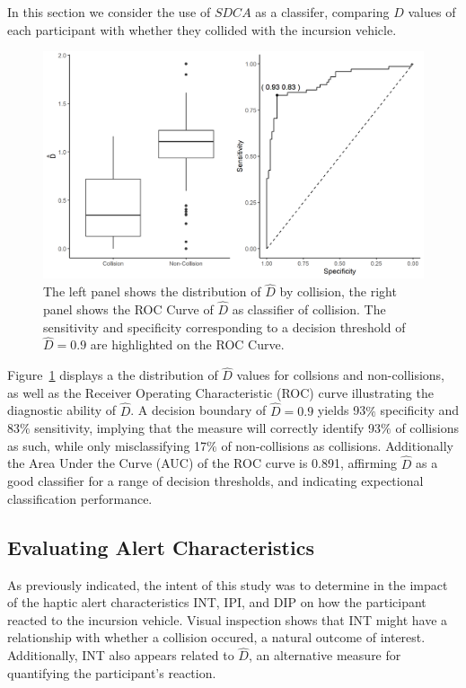\documentclass{article}
\begin{document}
In this section we consider the use of $SDCA$ as a classifer, comparing $\hat{D}$ values of each participant with whether they collided with the incursion vehicle.

\begin{figure}[h!]
\includegraphics[width=\textwidth]{fig2.png}
\caption{The left panel shows the distribution of $\hat{D}$ by collision, the right panel shows the ROC Curve of $\hat{D} $ as classifier of collision.  The sensitivity and specificity corresponding to a decision threshold of $\hat{D} = 0.9$ are highlighted on the ROC Curve.}
\label{figure 2}
\end{figure}

Figure~\ref{figure 2} displays a the distribution of $\hat{D}$ values for collsions and non-collisions, as well as the Receiver Operating Characteristic (ROC) curve illustrating the diagnostic ability of $\hat{D}$.  A decision boundary of $\hat{D} = 0.9$ yields 93$\%$ specificity and 83$\%$ sensitivity, implying that the measure will correctly identify 93$\%$ of collisions as such, while only misclassifying 17$\%$ of non-collisions as collisions.  Additionally the Area Under the Curve (AUC) of the ROC curve is 0.891, affirming $\hat{D}$ as a good classifier for a range of decision thresholds, and indicating expectional classification performance.

\subsection{Evaluating Alert Characteristics}

As previously indicated, the intent of this study was to determine in the impact of the haptic alert characteristics INT, IPI, and DIP on how the participant reacted to the incursion vehicle. Visual inspection shows that INT might have a relationship with whether a collision occured, a natural outcome of interest.  Additionally, INT also appears related to $\hat{D}$, an alternative measure for quantifying the participant's reaction.
\end{document}
